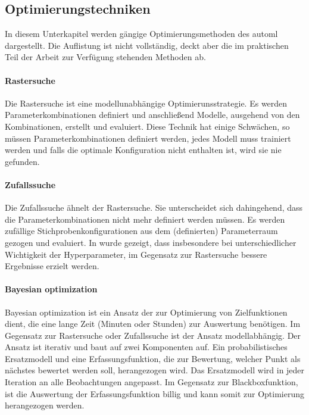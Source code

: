 	\subsection{Optimierungstechniken}
	\label{subsec:Optimierungstechniken}
	In diesem Unterkapitel werden gängige Optimierungsmethoden des \ac{automl} dargestellt. Die Auflistung ist nicht vollständig, deckt aber die im praktischen Teil der Arbeit zur Verfügung stehenden Methoden ab.  
	
	\paragraph{Rastersuche}
	Die Rastersuche \cite{Michelucci.2018} ist eine modellunabhängige Optimierunsstrategie. Es werden Parameterkombinationen definiert und anschließend Modelle, ausgehend von den Kombinationen, erstellt und evaluiert. Diese Technik hat einige Schwächen, so müssen Parameterkombinationen definiert werden, jedes Modell muss trainiert werden und falls die optimale Konfiguration nicht enthalten ist, wird sie nie gefunden. 
	
	\paragraph{Zufallssuche}
	Die Zufallssuche ähnelt der Rastersuche. Sie unterscheidet sich dahingehend, dass die Parameterkombinationen nicht mehr definiert werden müssen. Es werden zufällige Stichprobenkonfigurationen aus dem (definierten) Parameterraum gezogen und evaluiert. 
	In \cite{BergstraJamesandYoshuaBengio..2012} wurde gezeigt, dass insbesondere bei unterschiedlicher Wichtigkeit der Hyperparameter, im Gegensatz zur Rastersuche bessere Ergebnisse erzielt werden. 

	\paragraph{Bayesian optimization}
	Bayesian optimization ist ein Ansatz der zur Optimierung von Zielfunktionen dient, die eine lange Zeit (Minuten oder Stunden) zur Auswertung benötigen. Im Gegensatz zur Rastersuche oder Zufallssuche ist der Ansatz modellabhängig. Der Ansatz ist iterativ und baut auf zwei Komponenten auf. Ein probabilistisches Ersatzmodell und eine Erfassungsfunktion, die zur Bewertung, welcher Punkt als nächstes bewertet werden soll, herangezogen wird. Das Ersatzmodell wird in jeder Iteration an alle Beobachtungen angepasst. Im Gegensatz zur Blackboxfunktion, ist die Auswertung der Erfassungsfunktion billig und kann somit zur Optimierung herangezogen werden.
	\cite{Frazier.201807}
	
